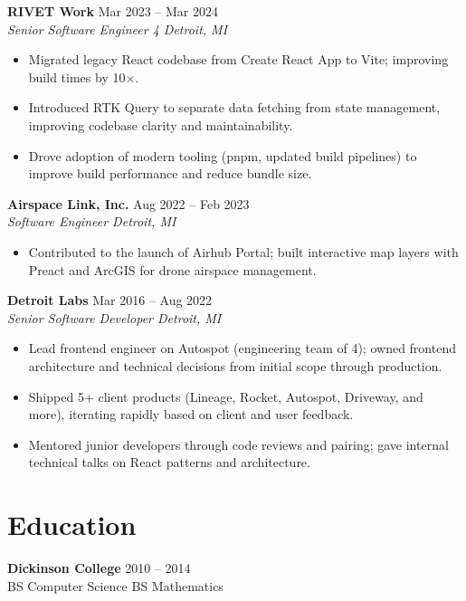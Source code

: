 \documentclass[11pt,letterpaper]{article}
\newcommand{\entry}[4]{%
  {\small\bfseries #1} \hfill {\footnotesize\color{light}#2} \\[-1pt]
  {\footnotesize\itshape #3 \hfill #4} \\[-4pt]
}
\begin{document}
\vspace{2pt}
\entry{RIVET Work}{Mar 2023 -- Mar 2024}{Senior Software Engineer 4}{Detroit, MI}
\begin{itemize}[nosep]
  \item {\small Migrated legacy React codebase from Create React App to Vite; improving build times by 10$\times$.}
  \item {\small Introduced RTK Query to separate data fetching from state management, improving codebase clarity and maintainability.}
  \item {\small Drove adoption of modern tooling (pnpm, updated build pipelines) to improve build performance and reduce bundle size.}
\end{itemize}

\vspace{2pt}
\entry{Airspace Link, Inc.}{Aug 2022 -- Feb 2023}{Software Engineer}{Detroit, MI}
\begin{itemize}[nosep]
  \item {\small Contributed to the launch of Airhub Portal; built interactive map layers with Preact and ArcGIS for drone airspace management.}
\end{itemize}

\vspace{2pt}
\entry{Detroit Labs}{Mar 2016 -- Aug 2022}{Senior Software Developer}{Detroit, MI}
\begin{itemize}[nosep]
  \item {\small Lead frontend engineer on Autospot (engineering team of 4); owned frontend architecture and technical decisions from initial scope through production.}
  \item {\small Shipped 5+ client products (Lineage, Rocket, Autospot, Driveway, and more), iterating rapidly based on client and user feedback.}
  \item {\small Mentored junior developers through code reviews and pairing; gave internal technical talks on React patterns and architecture.}
\end{itemize}

\section*{Education}
{\small\textbf{Dickinson College} \hfill {\color{light}2010 -- 2014}} \\
{\small BS Computer Science \enspace\textbar\enspace BS Mathematics}
\end{document}
